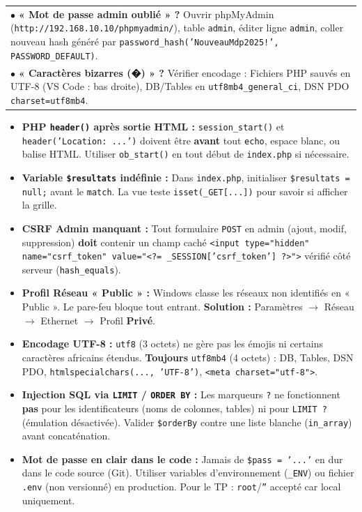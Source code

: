\documentclass[11pt]{article}
\begin{document}
\begin{exemplebox}
\begin{center}
\begin{tabularx}{\linewidth}{|X|}
$\bullet$ \textbf{« Mot de passe admin oublié » ?} Ouvrir phpMyAdmin (\texttt{http://192.168.10.10/phpmyadmin/}), table \texttt{admin}, éditer ligne \texttt{admin}, coller nouveau hash généré par \texttt{password\_hash('NouveauMdp2025!', PASSWORD\_DEFAULT)}. \\
$\bullet$ \textbf{« Caractères bizarres (�) » ?} Vérifier encodage : Fichiers PHP sauvés en UTF-8 (VS Code : bas droite), DB/Tables en \texttt{utf8mb4\_general\_ci}, DSN PDO \texttt{charset=utf8mb4}. \\\hline
\end{tabularx}
\end{center}
\end{exemplebox}

\begin{attention}
\begin{itemize}
    \item \textbf{PHP \texttt{header()} après sortie HTML :} \texttt{session\_start()} et \texttt{header('Location: ...')} doivent être \textbf{avant} tout \texttt{echo}, espace blanc, ou balise HTML. Utiliser \texttt{ob\_start()} en tout début de \texttt{index.php} si nécessaire.
    \item \textbf{Variable \texttt{\$resultats} indéfinie :} Dans \texttt{index.php}, initialiser \texttt{\$resultats = null;} avant le \texttt{match}. La vue teste \texttt{isset(\_GET[...])} pour savoir si afficher la grille.
    \item \textbf{CSRF Admin manquant :} Tout formulaire \texttt{POST} en admin (ajout, modif, suppression) \textbf{doit} contenir un champ caché \texttt{<input type="hidden" name="csrf\_token" value="<?= \_SESSION['csrf\_token'] ?>">} vérifié côté serveur (\texttt{hash\_equals}).
    \item \textbf{Profil Réseau « Public » :} Windows classe les réseaux non identifiés en « Public ». Le pare-feu bloque tout entrant. \textbf{Solution :} Paramètres $\to$ Réseau $\to$ Ethernet $\to$ Profil \textbf{Privé}.
    \item \textbf{Encodage UTF-8 :} \texttt{utf8} (3 octets) ne gère pas les émojis ni certains caractères africains étendus. \textbf{Toujours} \texttt{utf8mb4} (4 octets) : DB, Tables, DSN PDO, \texttt{htmlspecialchars(..., 'UTF-8')}, \texttt{<meta charset="utf-8">}.
    \item \textbf{Injection SQL via \texttt{LIMIT} / \texttt{ORDER BY} :} Les marqueurs \texttt{?} ne fonctionnent \textbf{pas} pour les identificateurs (noms de colonnes, tables) ni pour \texttt{LIMIT ?} (émulation désactivée). Valider \texttt{\$orderBy} contre une liste blanche (\texttt{in\_array}) avant concaténation.
    \item \textbf{Mot de passe en clair dans le code :} Jamais de \texttt{\$pass = '...'} en dur dans le code source (Git). Utiliser variables d'environnement (\texttt{\_ENV}) ou fichier \texttt{.env} (non versionné) en production. Pour le TP : \texttt{root}/\texttt{''} accepté car local uniquement.
\end{itemize}
\end{attention}
\end{document}
